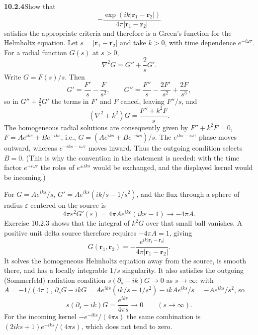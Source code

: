 \par\bigskip
\noindent\textbf{10.2.4}\quad Show that
\[
-\frac{\exp(ik|\mathbf{r}_{1}-\mathbf{r}_{2}|)}
{4\pi|\mathbf{r}_{1}-\mathbf{r}_{2}|}
\]
satisfies the appropriate criteria and therefore is a Green's function for the
Helmholtz equation. 
\solution
Let $s=|\mathbf r_1-\mathbf r_2|$ and take $k>0$, with time
dependence $e^{-i\omega\tau}$. For a radial function $G(s)$ at $s>0$,
\[
\nabla^2G=G''+\frac2sG'.
\]
Write $G=F(s)/s$. Then
\[
G'=\frac{F'}s-\frac F{s^2},\qquad
G''=\frac{F''}s-\frac{2F'}{s^2}+\frac{2F}{s^3},
\]
so in $G''+\frac2sG'$ the terms in $F'$ and $F$ cancel, leaving
$F''/s$, and
\[
(\nabla^2+k^2)G=\frac{F''+k^2F}{s}.
\]
The homogeneous radial solutions are consequently given by
$F''+k^2F=0$, $F=Ae^{iks}+Be^{-iks}$, i.e.,
$G=(Ae^{iks}+Be^{-iks})/s$. The $e^{iks-i\omega\tau}$ phase moves
outward, whereas $e^{-iks-i\omega\tau}$ moves inward. Thus the outgoing
condition selects $B=0$. (This is why the convention in the statement
is needed: with the time factor $e^{+i\omega\tau}$ the roles of
$e^{\pm iks}$ would be exchanged, and the displayed kernel would be
incoming.)

For $G=Ae^{iks}/s$, $G'=Ae^{iks}(ik/s-1/s^2)$, and the flux through a
sphere of radius $\varepsilon$ centered on the source is
\[
4\pi\varepsilon^2G'(\varepsilon)
=4\pi A e^{ik\varepsilon}(ik\varepsilon-1)
\longrightarrow-4\pi A.
\]
Exercise 10.2.3 shows that the integral of $k^2G$ over that small ball
vanishes. A positive unit delta source therefore requires $-4\pi A=1$,
giving
\[
\boxed{G(\mathbf r_1,\mathbf r_2)
=-\frac{e^{ik|\mathbf r_1-\mathbf r_2|}}
{4\pi|\mathbf r_1-\mathbf r_2|}.}
\]
It solves the homogeneous Helmholtz equation away from the source, is
smooth there, and has a locally integrable $1/s$ singularity.
It also satisfies the outgoing (Sommerfeld) radiation condition
$s(\partial_s-ik)G\to0$ as $s\to\infty$: with $A=-1/(4\pi)$,
$\partial_sG-ikG=Ae^{iks}(ik/s-1/s^2)-ikAe^{iks}/s=-Ae^{iks}/s^2$, so
\[
s(\partial_s-ik)G=\frac{e^{iks}}{4\pi s}\longrightarrow0
\qquad(s\to\infty).
\]
For the incoming kernel $-e^{-iks}/(4\pi s)$ the same combination is
$(2iks+1)e^{-iks}/(4\pi s)$, which does not tend to zero.

